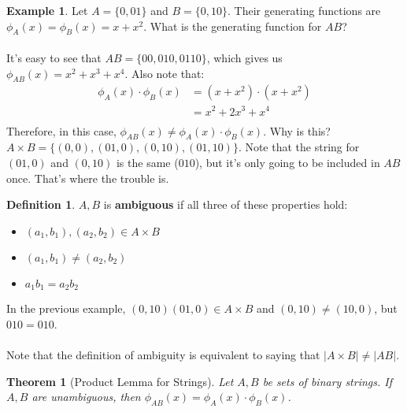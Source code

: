 \documentclass[]{article}
\newtheorem*{theorem}{Theorem}
\theoremstyle{definition}
\newtheorem*{defn}{Definition}
\newtheorem{ex}{Example}[section]
\newcommand{\lecture}[1]{\marginpar{{\footnotesize $\leftarrow$ \underline{#1}}}}
\begin{document}
			\begin{ex} \lecture{January 28, 2013}
				Let $A = \{0, 01\}$ and $B = \{0, 10\}$. Their generating functions are $\phi_A(x) = \phi_B(x) = x + x^2$. What is the generating function for $AB$?
				\\ \\
				It's easy to see that $AB = \{00, 010, 0110\}$, which gives us $\phi_{AB}(x) = x^2 + x^3 + x^4$. Also note that:
				\begin{align*}
					\phi_A(x) \cdot \phi_B(x) &= (x + x^2) \cdot (x + x^2) \\
					&= x^2 + 2x^3 + x^4 \\
				\end{align*}
				Therefore, in this case, $\phi_{AB}(x) \not = \phi_A(x) \cdot \phi_B(x)$. Why is this? $A \times B = \{ (0, 0), (01, 0), (0, 10), (01,10) \}$. Note that the string for $(01, 0)$ and $(0, 10)$ is the same ($010$), but it's only going to be included in $AB$ once. That's where the trouble is.
			\end{ex}

			\begin{defn}
				$A, B$ is \textbf{ambiguous} if all three of these properties hold:
				\begin{itemize}
					\item $(a_1, b_1), (a_2, b_2) \in A \times B$
					\item $(a_1, b_1) \not = (a_2, b_2)$
					\item $a_1b_1 = a_2b_2$
				\end{itemize}
			\end{defn}
			In the previous example, $(0, 10) (01, 0) \in A \times B$ and $(0, 10) \not = (10, 0)$, but $010 = 010$.
			\\ \\
			Note that the definition of ambiguity is equivalent to saying that $|A \times B| \not = |AB|$.

			\begin{theorem}[Product Lemma for Strings]
				Let $A, B$ be sets of binary strings. If $A, B$ are unambiguous, then $\phi_{AB}(x) = \phi_A(x) \cdot \phi_B(x)$.
			\end{theorem}
\end{document}
